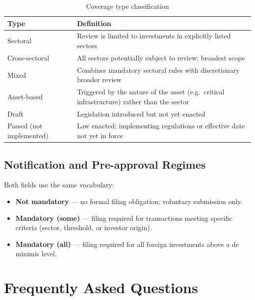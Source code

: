 \documentclass[12pt,a4paper]{article}
\begin{document}
\begin{table}[h]
\centering
\begin{tabularx}{\linewidth}{lX}
\toprule
\textbf{Type} & \textbf{Definition} \\
\midrule
Sectoral & Review is limited to investments in explicitly listed sectors \\
Cross-sectoral & All sectors potentially subject to review; broadest scope \\
Mixed & Combines mandatory sectoral rules with discretionary broader review \\
Asset-based & Triggered by the nature of the asset (e.g.\ critical infrastructure) rather than the sector \\
Draft & Legislation introduced but not yet enacted \\
Passed (not implemented) & Law enacted; implementing regulations or effective date not yet in force \\
\bottomrule
\end{tabularx}
\caption{Coverage type classification}
\end{table}

\subsection{Notification and Pre-approval Regimes}

Both fields use the same vocabulary:
\begin{itemize}
  \item \textbf{Not mandatory} — no formal filing obligation; voluntary submission only.
  \item \textbf{Mandatory (some)} — filing required for transactions meeting specific criteria (sector, threshold, or investor origin).
  \item \textbf{Mandatory (all)} — filing required for all foreign investments above a de minimis level.
\end{itemize}

\section{Frequently Asked Questions}
\label{sec:faq}
\end{document}
